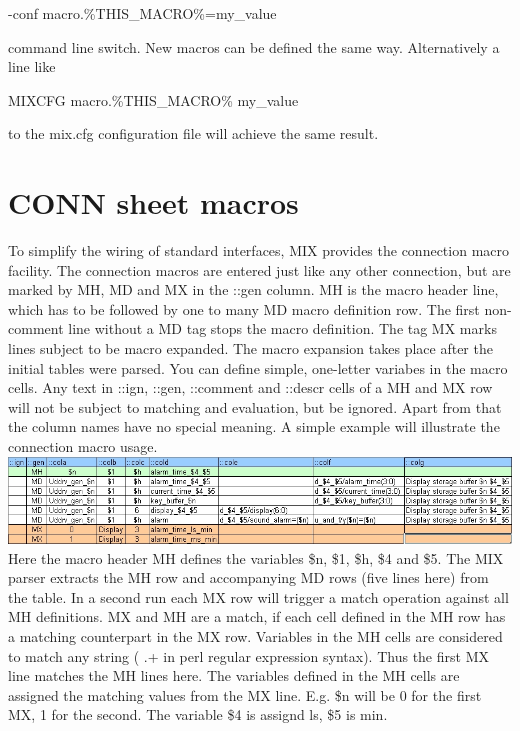 \documentclass[a4paper,12pt]{article}
\begin{document}
\hspace*{20mm}\begin{tt}-conf macro.\%THIS\_MACRO\%=my\_value\end{tt}\newline
command line switch. New macros can be defined the same way.\newline
Alternatively a line like\newline
\hspace*{20mm}\begin{tt}MIXCFG macro.\%THIS\_MACRO\% my\_value\end{tt}\newline
to the mix.cfg configuration file will achieve the same result.\newline

\section{CONN sheet macros}
To simplify the wiring of standard interfaces, MIX provides the connection macro facility. The connection macros are entered just like any other connection, but are marked by MH, MD and MX in the ::gen column. MH is the macro header line, which has to be followed by one to many MD macro definition row. The first non-comment line without a MD tag stops the macro definition.\newline
The tag MX marks lines subject to be macro expanded. The macro expansion takes place after the initial tables were parsed.\newline
You can define simple, one-letter variabes in the macro cells. Any text in ::ign, ::gen, ::comment and ::descr cells of a MH and MX row will not be subject to matching and evaluation, but be ignored. Apart from that the column names have no special meaning.\newline
\newline
A simple example will illustrate the connection macro usage.\newline
\includegraphics[scale=0.54]{images/macro.jpg}\\
Here the macro header MH defines the variables \$n, \$1, \$h, \$4 and \$5. The MIX parser extracts the MH row and accompanying MD rows (five lines here) from the table. In a second run each MX row will trigger a match operation against all MH definitions. MX and MH are a match, if each cell defined in the MH row has a matching counterpart in the MX row. Variables in the MH cells are considered to match any string ( .+ in perl regular expression syntax). Thus the first MX line matches the MH lines here. The variables defined in the MH cells are assigned the matching values from the MX line. E.g. \$n will be 0 for the first MX, 1 for the second. The variable \$4 is assignd ls, \$5 is min.\newline
\end{document}

